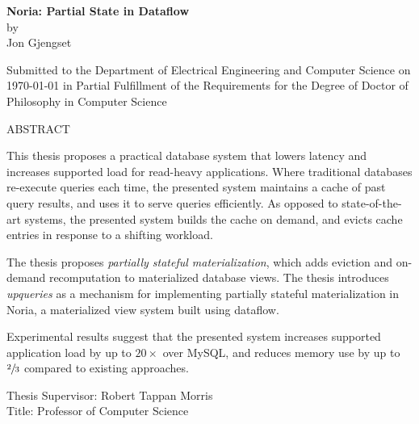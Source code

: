 \documentclass[fontsize=12pt,paper=letter]{scrartcl}
\begin{document}
\begin{titlepage}
  \begin{center}
    \textbf{\large Noria: Partial State in Dataflow}\\
    \vspace{0.5\baselineskip}
    by\\
    \vspace{0.5\baselineskip}
    {\large Jon Gjengset}\\
    \vspace{0.5\baselineskip}
    \begin{addmargin}[0.15in]{0.15in}
      \centering
    Submitted to the Department of
    Electrical Engineering and Computer Science
    on \today{}
    in Partial Fulfillment of the Requirements for the Degree of
    Doctor of Philosophy in Computer Science
    \end{addmargin}
  \end{center}

  \vspace{0.5\baselineskip}
  \begin{flushleft}
  ABSTRACT
  \vspace{0.5\baselineskip}

  This thesis proposes a practical database system that lowers latency and
    increases supported load for read-heavy applications. Where traditional
    databases re-execute queries each time, the presented system maintains a
    cache of past query results, and uses it to serve queries efficiently. As
    opposed to state-of-the-art systems, the presented system builds the cache
    on demand, and evicts cache entries in response to a shifting workload.

  \vspace{0.5\baselineskip}

  The thesis proposes \textit{partially stateful materialization}, which adds
    eviction and on-demand recomputation to materialized database views. The
    thesis introduces \textit{upqueries} as a mechanism for implementing
    partially stateful materialization in Noria, a materialized view system
    built using dataflow.

  \vspace{0.5\baselineskip}

  Experimental results suggest that the presented system increases supported
    application load by up to $20\times$ over MySQL, and reduces memory use by
    up to $\sfrac{2}{3}$ compared to existing approaches.

  \vspace{\baselineskip}
  Thesis Supervisor: Robert Tappan Morris\\
  Title: Professor of Computer Science


\end{flushleft}
\end{titlepage}
\end{document}
